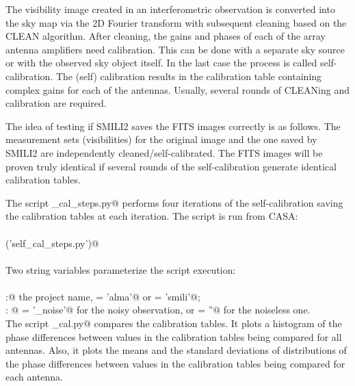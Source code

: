 \documentclass[preprint]{aastex}
\begin{document}
The visibility image created in an interferometric observation is converted into the sky map via the 2D Fourier transform with subsequent cleaning based on the CLEAN algorithm. After cleaning, the gains and phases of each of the array antenna amplifiers need calibration. This can be done with a separate sky source or with the observed sky object itself. In the last case the process is called self-calibration. The (self) calibration results in the calibration table containing complex gains for each of the antennas. Usually, several rounds of CLEANing and calibration are required. 

The idea of testing if SMILI2 saves the FITS images correctly is as follows. The measurement sets (visibilities) for the original image and the one saved by SMILI2 are independently cleaned/self-calibrated. The FITS images will be proven truly identical if several rounds of the self-calibration generate identical calibration tables.

The script \verb@self_cal_steps.py@  performs four iterations of the self-calibration saving the calibration tables at each iteration. The script is run from CASA: \\
\\
\verb@execfile('self_cal_steps.py')@
\\ \\
Two string variables parameterize the script execution: \\
\\
\verb@proj:@ the project name, \verb@proj = 'alma'@ or \verb@proj = 'smili'@; \\
\verb@ns:  @ \verb@ns = '_noise'@ for the noisy observation, or \verb@ns = ''@ for the noiseless one.
\\

The script \verb@diff_cal.py@ compares the calibration tables. It plots a histogram of the phase differences between values in the calibration tables being compared for all antennas. Also, it plots the means and the standard deviations of distributions of the phase differences between values in the calibration tables being compared for each antenna. 
\end{document}
